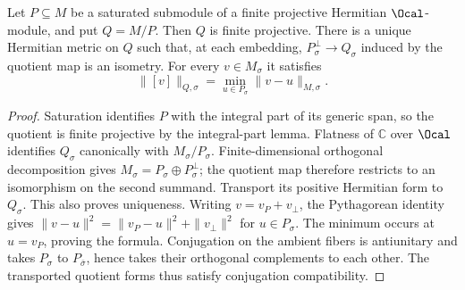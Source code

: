 \begin{lemma}
\label{lem:quotient-hermitian-metric}
\leanok
Let $P\subseteq M$ be a saturated submodule of a finite projective
Hermitian $\Ocal$-module, and put $Q=M/P$. Then $Q$ is finite projective.
There is a unique Hermitian metric on $Q$ such that, at each embedding,
$P_\sigma^\perp\to Q_\sigma$ induced by the quotient map is an isometry.
For every $v\in M_\sigma$ it satisfies
\[
 \|[v]\|_{Q,\sigma}=\min_{u\in P_\sigma}\|v-u\|_{M,\sigma}.
\]
\end{lemma}
\begin{proof}
Saturation identifies $P$ with the integral part of its generic span,
so the quotient is finite projective by the integral-part lemma.
Flatness of $\mathbb C$ over $\Ocal$ identifies $Q_\sigma$ canonically
with $M_\sigma/P_\sigma$. Finite-dimensional orthogonal decomposition
gives $M_\sigma=P_\sigma\oplus P_\sigma^\perp$; the quotient map
therefore restricts to an isomorphism on the second summand. Transport
its positive Hermitian form to $Q_\sigma$. This also proves uniqueness.
Writing $v=v_P+v_\perp$, the Pythagorean identity gives
$\|v-u\|^2=\|v_P-u\|^2+\|v_\perp\|^2$ for $u\in P_\sigma$.
The minimum occurs at $u=v_P$, proving the formula.
Conjugation on the ambient fibers is antiunitary and takes $P_\sigma$
to $P_{\bar\sigma}$, hence takes their orthogonal complements to each
other. The transported quotient forms thus satisfy conjugation
compatibility.
\end{proof}

